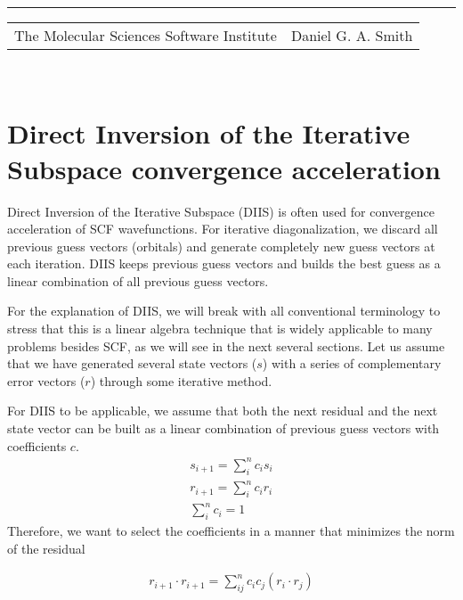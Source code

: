 \documentclass[aip,jcp,preprint,superscriptaddress,floatfix]{revtex4-1}
\renewcommand{\title}[1]{\textbf{\large{#1}}\\}
\newcommand{\leftright}[2]{\begin{tabularx}{\textwidth}{X>{\raggedleft}X}#1%
& #2\\\end{tabularx}\\[-1cm]}
\begin{document}
\title{}
\rule{\textwidth}{1pt}
\leftright{The Molecular Sciences Software Institute}{Daniel G. A. Smith} %

\bigskip

\section{Direct Inversion of the Iterative Subspace convergence acceleration}
Direct Inversion of the Iterative Subspace (DIIS) is often used for convergence acceleration\cite{Pulay:1980jn} of SCF wavefunctions.
For iterative diagonalization, we discard all previous guess vectors (orbitals) and generate completely new guess vectors at each iteration.
DIIS keeps previous guess vectors and builds the best guess as a linear combination of all previous guess vectors.

For the explanation of DIIS, we will break with all conventional terminology to stress that this is a linear algebra technique that is widely applicable to many problems besides SCF, as we will see in the next several sections.
Let us assume that we have generated several state vectors ($s$) with a series of complementary error vectors ($r$) through some iterative method.

For DIIS to be applicable, we assume that both the next residual and the next state vector can be built as a linear combination of previous guess vectors with coefficients $c$.
\begin{eqnarray}
\label{diis_truths} 
s_{i+1} = \sum_{i}^{n} c_is_i\\
r_{i+1} = \sum_{i}^{n} c_ir_i\\
\sum_{i}^{n} c_i = 1
\end{eqnarray}
Therefore, we want to select the coefficients in a manner that minimizes the norm of the residual

\begin{eqnarray}
\label{diis_min} 
r_{i+1}\cdot r_{i+1} = \sum_{ij}^{n}c_ic_j(r_i \cdot r_j)
\end{eqnarray}
\end{document}
